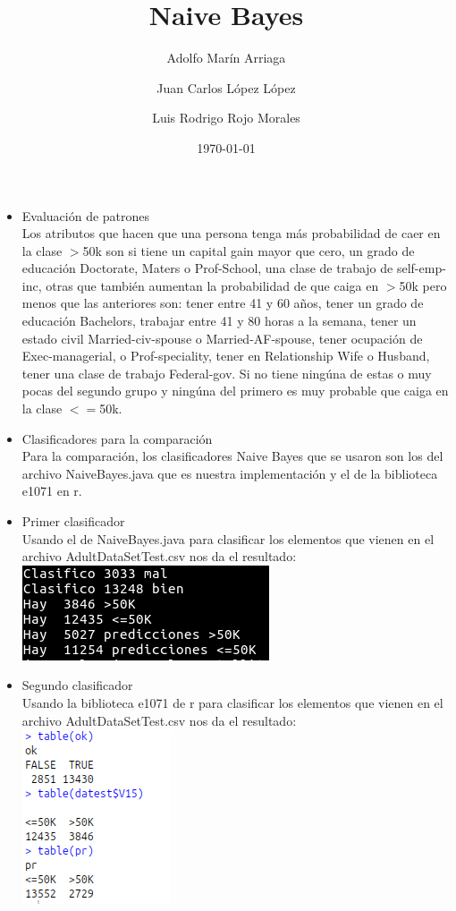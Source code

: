 \documentclass{article}
\title{Naive Bayes}
\author{Adolfo Marín Arriaga \and Juan Carlos López López \and Luis Rodrigo Rojo Morales}
\date{\today\\}
\begin{document}
 \maketitle
 
 \begin{itemize}
 \item Evaluación de patrones\\
 Los atributos que hacen que una persona tenga más probabilidad de caer en la clase $>$50k son si tiene un capital gain mayor que cero, un grado de educación Doctorate, Maters o Prof-School,
 una clase de trabajo de self-emp-inc, otras que también aumentan la probabilidad de que caiga en $>$50k pero menos que las anteriores son: tener entre 41 y 60 años, tener 
 un grado de educación Bachelors, trabajar entre 41 y 80 horas a la semana, tener un estado civil Married-civ-spouse o Married-AF-spouse, tener ocupación de Exec-managerial,
 o Prof-speciality, tener en Relationship Wife o Husband, tener una clase de trabajo Federal-gov. Si no tiene ningúna de estas o muy pocas del segundo grupo y ningúna del
 primero es muy probable que caiga en la clase $<=$50k.
  \item Clasificadores para la comparación\\
  Para la comparación, los clasificadores Naive Bayes que se usaron son los del archivo NaiveBayes.java que es nuestra implementación y el de la biblioteca e1071 en r.
  \item Primer clasificador\\
  Usando el de NaiveBayes.java para clasificar los elementos que vienen en el archivo AdultDataSetTest.csv nos da el resultado:\\
  \includegraphics[scale=1]{nbjava}
  \item Segundo clasificador\\
  Usando la biblioteca e1071 de r para clasificar los elementos que vienen en el archivo AdultDataSetTest.csv nos da el resultado:\\
  \includegraphics[scale=1]{nbr}\\

\end{itemize}
\end{document}
